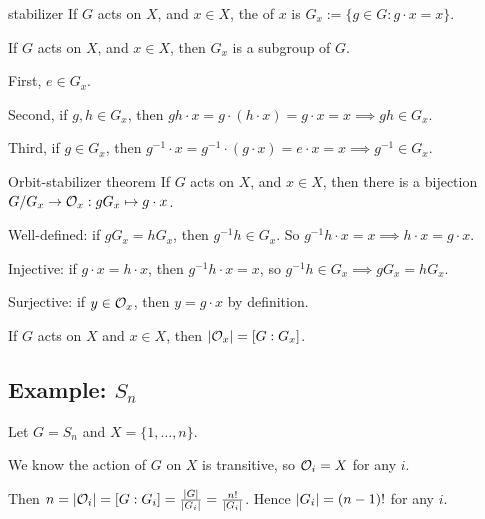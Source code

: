 \documentclass[12pt,letterpaper]{report}
\begin{document}
\begin{defn}{stabilizer}{}
  If $G$ acts on $X$, and $x \in X$, the  of $x$ is
  $G_x := \{g \in G : g \cdot x = x\}$.
\end{defn}

\begin{prop}{}{}
  If $G$ acts on $X$, and $x \in X$, then $G_x$ is a subgroup of $G$.
\end{prop}

\begin{thmproof}
  First, $e \in G_x$.

  Second, if $g, h \in G_x$, then
  $gh \cdot x = g \cdot (h \cdot x) = g \cdot x = x \implies gh \in G_x$.

  Third, if $g \in G_x$, then
  $g^{-1} \cdot x = g^{-1} \cdot (g \cdot x) = e \cdot x = x \implies g^{-1} \in G_x$.
\end{thmproof}

\begin{thm}{Orbit-stabilizer theorem}{}
  If $G$ acts on $X$, and $x \in X$, then there is a bijection
  $G/G_x \to \mathcal{O}_x : gG_x \mapsto g \cdot x$.
\end{thm}

\begin{thmproof}
  Well-defined: if $gG_x = hG_x$, then $g^{-1}h \in G_x$.
  So $g^{-1}h \cdot x = x \implies h \cdot x = g \cdot x$.

  Injective: if $g \cdot x = h \cdot x$, then $g^{-1}h \cdot x = x$, so
  $g^{-1}h \in G_x \implies gG_x = hG_x$.

  Surjective: if $y \in \mathcal{O}_x$, then $y = g \cdot x$ by definition.
\end{thmproof}

\begin{cor}{}{}
  If $G$ acts on $X$ and $x \in X$, then $\lvert\mathcal{O}_x\rvert = [G : G_x]$.
\end{cor}

\pagebreak
\subsection[Example: Sn]{Example: $S_n$}

Let $G = S_n$ and $X = \{1, \ldots, n\}$.

We know the action of $G$ on $X$ is transitive, so $\mathcal{O}_i = X$ for any $i$.

Then $n = \lvert\mathcal{O}_i\rvert = [G : G_i] = \frac{\lvert G\rvert}{\lvert G_i\rvert} = \frac{n!}{\lvert G_i\rvert}$.
Hence $\lvert G_i\rvert = (n - 1)!$ for any $i$.
\end{document}
